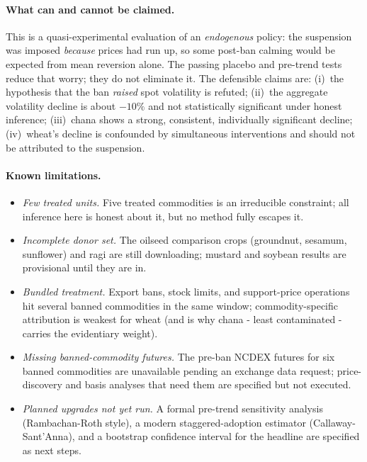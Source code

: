\documentclass[11pt]{article}
\begin{document}
\paragraph{What can and cannot be claimed.} This is a quasi-experimental evaluation of an
\emph{endogenous} policy: the suspension was imposed \emph{because} prices had run up, so
some post-ban calming would be expected from mean reversion alone. The passing placebo
and pre-trend tests reduce that worry; they do not eliminate it. The defensible claims
are: (i)~the hypothesis that the ban \emph{raised} spot volatility is refuted;
(ii)~the aggregate volatility decline is about $-10\%$ and not statistically significant
under honest inference; (iii)~chana shows a strong, consistent, individually significant
decline; (iv)~wheat's decline is confounded by simultaneous interventions and should not
be attributed to the suspension.

\paragraph{Known limitations.}
\begin{itemize}[leftmargin=1.6em,itemsep=1pt]
  \item \emph{Few treated units.} Five treated commodities is an irreducible constraint;
        all inference here is honest about it, but no method fully escapes it.
  \item \emph{Incomplete donor set.} The oilseed comparison crops (groundnut, sesamum,
        sunflower) and ragi are still downloading; mustard and soybean results are
        provisional until they are in.
  \item \emph{Bundled treatment.} Export bans, stock limits, and support-price operations
        hit several banned commodities in the same window; commodity-specific attribution
        is weakest for wheat (and is why chana - least contaminated - carries the
        evidentiary weight).
  \item \emph{Missing banned-commodity futures.} The pre-ban NCDEX futures for six banned
        commodities are unavailable pending an exchange data request; price-discovery and
        basis analyses that need them are specified but not executed.
  \item \emph{Planned upgrades not yet run.} A formal pre-trend sensitivity analysis
        (Rambachan-Roth style), a modern staggered-adoption estimator
        (Callaway-Sant'Anna), and a bootstrap confidence interval for the headline are
        specified as next steps.
\end{itemize}
\end{document}
